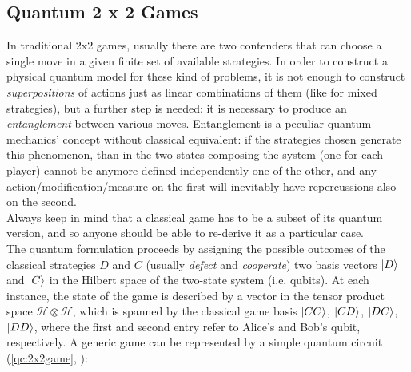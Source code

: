 \subsection{Quantum 2 x 2 Games}
In traditional 2x2 games, usually there are two contenders that can choose a single move in a given finite set of available strategies. In order to construct a physical quantum model for these kind of problems, it is not enough to construct \textit{superpositions} of actions just as linear combinations of them (like for mixed strategies), but a further step is needed: it is necessary to produce an \textit{entanglement} between various moves. Entanglement is a peculiar quantum mechanics' concept without classical equivalent: if the strategies chosen generate this phenomenon, than in the two states composing the system (one for each player) cannot be anymore defined independently one of the other, and any action/modification/measure on the first will inevitably have repercussions also on the second.\\
Always keep in mind that a classical game has to be a subset of its quantum version, and so anyone should be able to re-derive it as a particular case.\\
The quantum formulation proceeds by assigning the possible
outcomes of the classical strategies $D$ and $C$ (usually \textit{defect} and \textit{cooperate}) two basis vectors $\ket{D}$ and $\ket{C}$ in the Hilbert space of the two-state system (i.e. qubits). At each instance, the state of the game is described by a vector in the tensor product space $\mathcal{H}\otimes\mathcal{H}$, which is spanned by
the classical game basis $\ket{CC}$, $\ket{CD}$, $\ket{DC}$, $\ket{DD}$, where
the first and second entry refer to Alice’s and Bob’s qubit,
respectively. A generic game can be represented by a simple quantum circuit (\ref{qc:2x2game}, \cite{Flitney_Abbott_introduction}):
